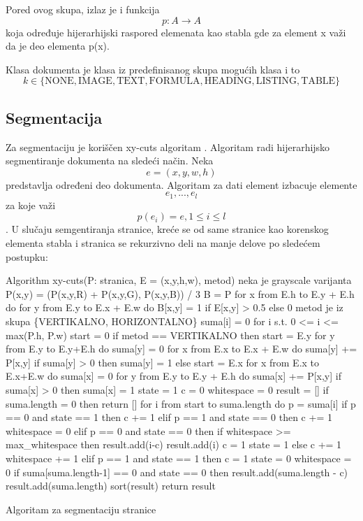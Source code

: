\documentclass[]{amsart}
\begin{document}
Pored ovog skupa, izlaz je i funkcija $$ p : A \to A $$ koja određuje hijerarhijski raspored elemenata kao stabla gde za element x važi da je
deo elementa p(x). 

Klasa dokumenta je klasa iz predefinisanog skupa mogućih klasa i to $$ k \in \{\text{NONE}, \text{IMAGE}, \text{TEXT}, \text{FORMULA}, \text{HEADING}, \text{LISTING}, \text{TABLE}\} $$ 



\subsection{Segmentacija}
\label{sec:org7eee69b}

Za segmentaciju je koriščen xy-cuts algoritam \cite{ha1995recursive}. Algoritam radi hijerarhijsko segmentiranje dokumenta na sledeći način. Neka $$ e = (x,y,w,h) $$ predstavlja određeni
deo dokumenta. Algoritam za dati element izbacuje elemente $$ e_1, ..., e_l $$ za koje važi $$ p(e_i) = e, 1 \le i \le l $$. U slučaju semgentiranja stranice, kreće se od same stranice kao korenskog elementa
stabla i stranica se rekurzivno deli na manje delove po sledećem postupku:


\begin{program}
	\begin{CodeListing}
		Algorithm xy-cuts(P: stranica, E = (x,y,h,w), metod)
			neka je grayscale varijanta 
				P(x,y) = (P(x,y,R) + P(x,y,G), P(x,y,B)) / 3 
			B = P
			for x from E.h to E.y + E.h do
				for y from E.y to E.x + E.w do
					B[x,y] = 1 if E[x,y] > 0.5 else 0 
			metod je iz skupa \{VERTIKALNO, HORIZONTALNO\}
			suma[i] = 0 for i s.t. 0 <= i <= max(P.h, P.w)
			start = 0 
			if metod == VERTIKALNO then 
				start = E.y
				for y from E.y to E.y+E.h do
					suma[y] = 0
					for x from E.x to E.x + E.w do
						suma[y] += P[x,y]
					if suma[y] > 0 then
						suma[y] = 1
			else
				start = E.x
				for x from E.x to E.x+E.w do
					suma[x] = 0
					for y from E.y to E.y + E.h do
						suma[x] += P[x,y]
					if suma[x] > 0 then
						suma[x] = 1
			state = 1
			c = 0
			whitespace = 0
			result = []
			if suma.length = 0 then return []
			for i from start to suma.length do
				p = suma[i]
				if p == 0 and state == 1 then c += 1 
				elif p == 1 and state == 0 then 
					c += 1
					whitespace = 0
				elif p == 0 and state == 0 then 
					if whitespace >= max_whitespace then 
						result.add(i-c)
						result.add(i)
						c = 1 
						state = 1 
					else
						c += 1
						whitespace += 1
				elif p == 1 and state == 1 then 
					c = 1 
					state = 0
					whitespace = 0
			if suma[suma.length-1] == 0 and state == 0 then 
				result.add(suma.length - c)
				result.add(suma.length)
			sort(result)
			return result 
	\end{CodeListing}
	\caption{Algoritam za segmentaciju stranice}
\end{program}
\end{document}
